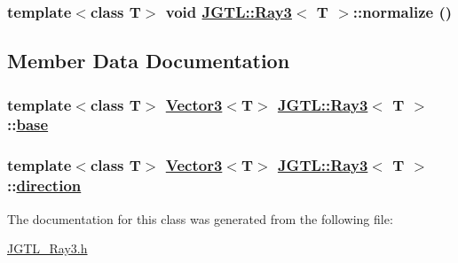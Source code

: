 \hypertarget{class_j_g_t_l_1_1_ray3_939795292a630247cd6d0eb27bd17527}{
\subsubsection[normalize]{\setlength{\rightskip}{0pt plus 5cm}template$<$class T$>$ void \hyperlink{class_j_g_t_l_1_1_ray3}{JGTL::Ray3}$<$ T $>$::normalize ()}}
\label{class_j_g_t_l_1_1_ray3_939795292a630247cd6d0eb27bd17527}




\subsection{Member Data Documentation}
\hypertarget{class_j_g_t_l_1_1_ray3_7f6edc8423bebe5ad9147f216766c4cf}{
\subsubsection[base]{\setlength{\rightskip}{0pt plus 5cm}template$<$class T$>$ \hyperlink{class_j_g_t_l_1_1_vector3}{Vector3}$<$T$>$ \hyperlink{class_j_g_t_l_1_1_ray3}{JGTL::Ray3}$<$ T $>$::\hyperlink{class_j_g_t_l_1_1_ray3_7f6edc8423bebe5ad9147f216766c4cf}{base}}}
\label{class_j_g_t_l_1_1_ray3_7f6edc8423bebe5ad9147f216766c4cf}


\hypertarget{class_j_g_t_l_1_1_ray3_611f05fc7fab5c587ae5d13aeed02b03}{
\subsubsection[direction]{\setlength{\rightskip}{0pt plus 5cm}template$<$class T$>$ \hyperlink{class_j_g_t_l_1_1_vector3}{Vector3}$<$T$>$ \hyperlink{class_j_g_t_l_1_1_ray3}{JGTL::Ray3}$<$ T $>$::\hyperlink{class_j_g_t_l_1_1_ray3_611f05fc7fab5c587ae5d13aeed02b03}{direction}}}
\label{class_j_g_t_l_1_1_ray3_611f05fc7fab5c587ae5d13aeed02b03}




The documentation for this class was generated from the following file:\begin{CompactItemize}
\item 
\hyperlink{_j_g_t_l___ray3_8h}{JGTL\_\-Ray3.h}\end{CompactItemize}
